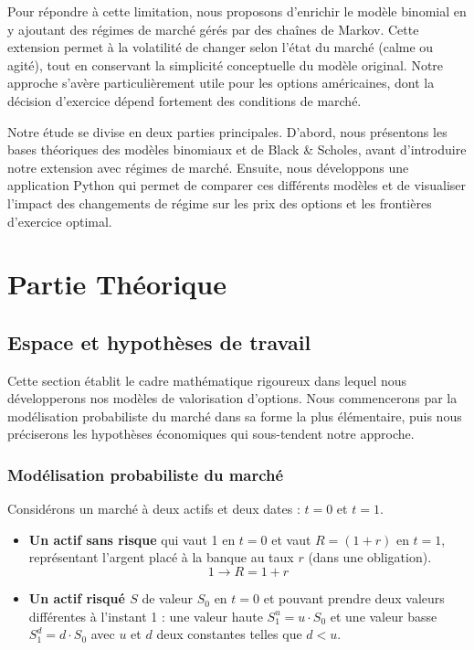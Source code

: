 \documentclass[12pt,a4paper]{report}
\begin{document}
\vspace{0.3cm}

Pour répondre à cette limitation, nous proposons d'enrichir le modèle binomial en y ajoutant des régimes de marché gérés par des chaînes de Markov. Cette extension permet à la volatilité de changer selon l'état du marché (calme ou agité), tout en conservant la simplicité conceptuelle du modèle original. Notre approche s'avère particulièrement utile pour les options américaines, dont la décision d'exercice dépend fortement des conditions de marché.

\vspace{0.3cm}

Notre étude se divise en deux parties principales. D'abord, nous présentons les bases théoriques des modèles binomiaux et de Black \& Scholes, avant d'introduire notre extension avec régimes de marché. Ensuite, nous développons une application Python qui permet de comparer ces différents modèles et de visualiser l'impact des changements de régime sur les prix des options et les frontières d'exercice optimal.



\chapter{Partie Théorique}
\section{Espace et hypothèses de travail}

Cette section établit le cadre mathématique rigoureux dans lequel nous développerons nos modèles de valorisation d'options. Nous commencerons par la modélisation probabiliste du marché dans sa forme la plus élémentaire, puis nous préciserons les hypothèses économiques qui sous-tendent notre approche.

\subsection{Modélisation probabiliste du marché}

Considérons un marché à deux actifs et deux dates : $t = 0$ et $t = 1$.

\begin{itemize}
    \item \textbf{Un actif sans risque} qui vaut 1 en $t = 0$ et vaut $R = (1 + r)$ en $t = 1$, représentant l'argent placé à la banque au taux $r$ (dans une obligation). 
    $$1 \rightarrow R = 1 + r$$
    
    \item \textbf{Un actif risqué $S$} de valeur $S_0$ en $t = 0$ et pouvant prendre deux valeurs différentes à l'instant 1 : une valeur haute $S_1^u = u \cdot S_0$ et une valeur basse $S_1^d = d \cdot S_0$ avec $u$ et $d$ deux constantes telles que $d < u$.
\end{itemize}
\end{document}
